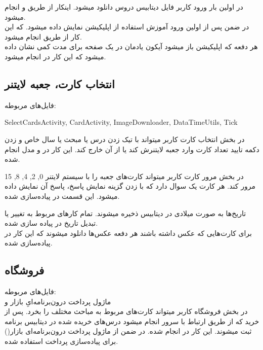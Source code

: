 \documentclass[11pt]{article}
\begin{document}
در اولین بار ورود کاربر فایل دیتابیس دروس دانلود میشود. اینکار از طریق  و  انجام میشود.\\
در ضمن پس از اولین ورود آموزش استفاده از اپلیکیشن نمایش داده میشود. که این کار از طریق  انجام میشود.\\
هر دفعه که اپلیکیشن باز میشود آیکون یادمان در یک صفحه برای مدت کمی نشان داده میشود که این کار در  انجام میشود.

\subsection{انتخاب کارت، جعبه لایتنر}
فایل‌های مربوطه:\\
\begin{latin}
SelectCardsActivity, CardActivity, ImageDownloader, DataTimeUtils, Tick\\
\end{latin}

در بخش انتخاب کارت کاربر میتواند با تیک زدن درس یا مبحث یا سال خاص و زدن دکمه تایید تعداد کارت وارد جعبه لایتنرش کند یا از آن خارج کند. این کار در  و مدل  انجام شده.\par
در بخش مرور کارت کاربر میتواند کارت‌های جعبه را با سیستم لایتنر {0, 2, 4, 8, 15} مرور کند. هر کارت یک سوال دارد که با زدن گزینه نمایش پاسخ، پاسخ آن نمایش داده میشود. این قسمت در  پیاده‌سازی شده.\par
تاریخ‌ها به صورت میلادی در دیتابیس ذخیره میشوند. تمام کار‌های مربوط به تغییر یا تبدیل تاریخ در  پیاده سازی شده.\\
برای کارت‌هایی که عکس داشته‌ باشند هر دفعه عکس‌ها دانلود میشوند که این کار در  پیاده‌سازی شده.


\subsection{فروشگاه}
فایل‌های مربوطه:\\
ماژول پرداخت درون‌برنامه‌ایِ بازار  و  \\

در بخش فروشگاه کاربر میتواند کارت‌های مربوط به مباحث مختلف را بخرد. پس از خرید که از طریق ارتباط با سرور انجام میشود درس‌های خریده شده در دیتابیس برنامه ثبت میشوند. این کار در  انجام شده. در ضمن از ماژول پرداخت درون‌برنامه‌ای بازار() برای پیاده‌سازی پرداخت استفاده شده.
\end{document}
